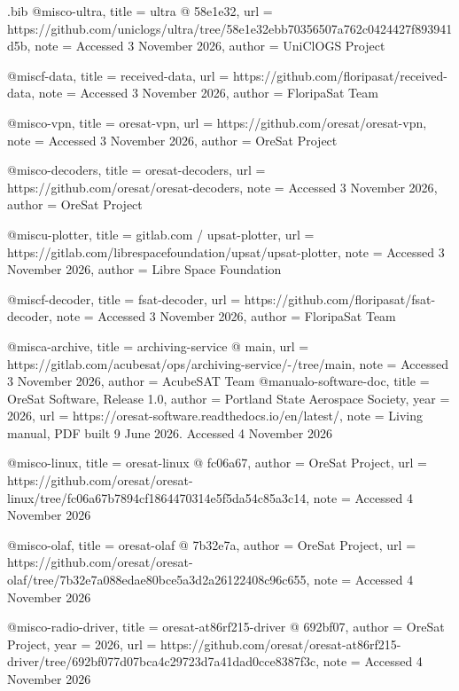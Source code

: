 \begin{filecontents*}[overwrite]{\jobname.bib}
@misc{o-ultra,
  title = {{ultra @ 58e1e32}},
  url = {https://github.com/uniclogs/ultra/tree/58e1e32ebb70356507a762c0424427f893941d5b},
  note = {Accessed 3 November 2026},
  author = {{UniClOGS Project}}
}

@misc{f-data,
  title = {{received-\allowbreak{}data}},
  url = {https://github.com/floripasat/received-data},
  note = {Accessed 3 November 2026},
  author = {{FloripaSat Team}}
}

@misc{o-vpn,
  title = {{oresat-\allowbreak{}vpn}},
  url = {https://github.com/oresat/oresat-vpn},
  note = {Accessed 3 November 2026},
  author = {{OreSat Project}}
}

@misc{o-decoders,
  title = {{oresat-\allowbreak{}decoders}},
  url = {https://github.com/oresat/oresat-decoders},
  note = {Accessed 3 November 2026},
  author = {{OreSat Project}}
}

@misc{u-plotter,
  title = {{gitlab.com /\allowbreak{} upsat-\allowbreak{}plotter}},
  url = {https://gitlab.com/librespacefoundation/upsat/upsat-plotter},
  note = {Accessed 3 November 2026},
  author = {{Libre Space Foundation}}
}

@misc{f-decoder,
  title = {{fsat-\allowbreak{}decoder}},
  url = {https://github.com/floripasat/fsat-decoder},
  note = {Accessed 3 November 2026},
  author = {{FloripaSat Team}}
}

@misc{a-archive,
  title = {{archiving-\allowbreak{}service @ main}},
  url = {https://gitlab.com/acubesat/ops/archiving-service/-/tree/main},
  note = {Accessed 3 November 2026},
  author = {{AcubeSAT Team}}
}
@manual{o-software-doc,
  title = {{OreSat Software, Release 1.0}},
  author = {{Portland State Aerospace Society}},
  year = {2026},
  url = {https://oresat-software.readthedocs.io/en/latest/},
  note = {Living manual, PDF built 9 June 2026. Accessed 4 November 2026}
}

@misc{o-linux,
  title = {{oresat-\allowbreak{}linux @ fc06a67}},
  author = {{OreSat Project}},
  url = {https://github.com/oresat/oresat-linux/tree/fc06a67b7894cf1864470314e5f5da54c85a3c14},
  note = {Accessed 4 November 2026}
}

@misc{o-olaf,
  title = {{oresat-\allowbreak{}olaf @ 7b32e7a}},
  author = {{OreSat Project}},
  url = {https://github.com/oresat/oresat-olaf/tree/7b32e7a088edae80bce5a3d2a26122408c96c655},
  note = {Accessed 4 November 2026}
}

@misc{o-radio-driver,
  title = {{oresat-\allowbreak{}at86rf215-\allowbreak{}driver @ 692bf07}},
  author = {{OreSat Project}},
  year = {2026},
  url = {https://github.com/oresat/oresat-at86rf215-driver/tree/692bf077d07bca4c29723d7a41dad0cce8387f3c},
  note = {Accessed 4 November 2026}
}


\end{filecontents*}
